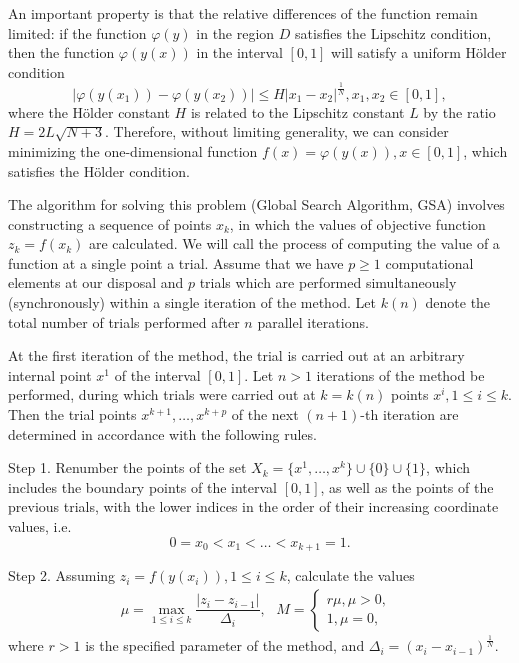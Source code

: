 \documentclass{svproc}
\begin{document}
An important property is that the relative differences of the function remain limited: if the function \(\varphi(y)\) in the region \(D\) satisfies the Lipschitz condition, then the function \(\varphi(y(x))\) in the interval \([0,1]\) will satisfy a uniform H{\"o}lder condition
\begin{displaymath}
\label{holder}
|\varphi(y(x_1))-\varphi(y(x_2))|\leqslant H{|x_1-x_2|}^{\frac{1}{N}}, x_1,x_2\in[0,1],
\end{displaymath}
where the H{\"o}lder constant \(H\) is related to the Lipschitz constant \(L\) by the ratio $ H=2L\sqrt{N+3}$. 
Therefore, without limiting generality, we can consider minimizing the one-dimensional function \(f(x)=\varphi(y(x)), x\in[0,1]\), which satisfies the H{\"o}lder condition.

The algorithm for solving this problem (Global Search Algorithm, GSA) involves constructing a sequence of points \(x_k\), in which the values of objective function \(z_k = f(x_k)\) are calculated. We will call the process of computing the value of a function at a single point a trial. Assume that we have \(p\geqslant 1\) computational elements at our disposal and \(p\) trials which are performed simultaneously (synchronously) within a single iteration of the method. Let \(k(n)\) denote the total number of trials performed after \(n\) parallel iterations.

At the first iteration of the method, the trial is carried out at an arbitrary internal point \(x^1\) of the interval \([0,1]\). Let \(n>1\) iterations of the method be performed, during which trials were carried out at \(k = k(n)\) points \(x^i, 1\leqslant i\leqslant k\). Then the trial points  \(x^{k+1},\dotsc,x^{k+p}\) of the next \((n+1)\)-th iteration are determined in accordance with the following rules.

Step 1. Renumber the points of the set \(X_k=\{x^1,\dotsc,x^k\}\cup\{0\}\cup\{1\}\), which includes the boundary points of the interval \([0,1]\), as well as the points of the previous trials, with the lower indices in the order of their increasing coordinate values, i.e.
\begin{displaymath}
0=x_0<x_1<\dotsc<x_{k+1}=1.
\end{displaymath}

Step 2. Assuming \(z_i=f(y(x_i)),1\leqslant i\leqslant k\), calculate the values
\begin{displaymath}
\label{step2}
\mu=\max_{1\leqslant i\leqslant k}\dfrac{|z_i-z_{i-1}|}{\Delta_i}, \;
\begin{matrix}
    M = 
    \left\{
    \begin{matrix}
    r\mu,\mu>0, \\
    1,\mu=0,
    \end{matrix} \right.
    \end{matrix}
\end{displaymath}
where \(r > 1\) is the specified parameter of the method, and \(\Delta_i=(x_i-x_{i-1})^\frac{1}{N}\). 
\end{document}
